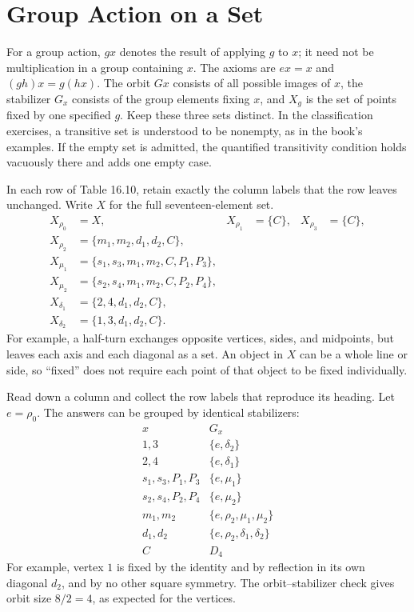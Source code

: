 \section{Group Action on a Set}

For a group action, $gx$ denotes the result of applying $g$ to $x$; it need
not be multiplication in a group containing $x$. The axioms are $ex=x$ and
$(gh)x=g(hx)$. The orbit $Gx$ consists of all possible images of $x$, the
stabilizer $G_x$ consists of the group elements fixing $x$, and $X_g$ is
the set of points fixed by one specified $g$. Keep these three sets distinct.
In the classification exercises, a transitive set is understood to be
nonempty, as in the book's examples. If the empty set is admitted, the
quantified transitivity condition holds vacuously there and adds one empty case.

\idea In each row of Table 16.10, retain exactly the column labels that the
row leaves unchanged. Write $X$ for the full seventeen-element set.
\begin{align*}
X_{\rho_0}&=X,&X_{\rho_1}&=\{C\},&X_{\rho_3}&=\{C\},\\
X_{\rho_2}&=\{m_1,m_2,d_1,d_2,C\},\\
X_{\mu_1}&=\{s_1,s_3,m_1,m_2,C,P_1,P_3\},\\
X_{\mu_2}&=\{s_2,s_4,m_1,m_2,C,P_2,P_4\},\\
X_{\delta_1}&=\{2,4,d_1,d_2,C\},\\
X_{\delta_2}&=\{1,3,d_1,d_2,C\}.
\end{align*}
For example, a half-turn exchanges opposite vertices, sides, and midpoints,
but leaves each axis and each diagonal as a set. An object in $X$ can be a
whole line or side, so ``fixed'' does not require each point of that object
to be fixed individually.

\idea Read down a column and collect the row labels that reproduce its heading.
Let $e=\rho_0$. The answers can be grouped by identical stabilizers:
\[
\begin{array}{c|l}
 x&G_x\\\hline
1,3&\{e,\delta_2\}\\
2,4&\{e,\delta_1\}\\
s_1,s_3,P_1,P_3&\{e,\mu_1\}\\
s_2,s_4,P_2,P_4&\{e,\mu_2\}\\
m_1,m_2&\{e,\rho_2,\mu_1,\mu_2\}\\
d_1,d_2&\{e,\rho_2,\delta_1,\delta_2\}\\
C&D_4
\end{array}
\]
For example, vertex $1$ is fixed by the identity and by reflection in its
own diagonal $d_2$, and by no other square symmetry. The orbit--stabilizer
check gives orbit size $8/2=4$, as expected for the vertices.

